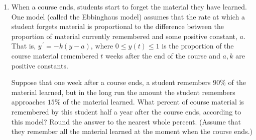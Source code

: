 \documentclass{ximera}
\begin{document}
\begin{enumerate}[label=(\arabic*)]
 












\item When a course ends, students start to forget the material they have learned.  One model (called the Ebbinghaus model) assumes that the rate at which a student forgets material is proportional to the difference between the proportion of material currently remembered and some positive constant, $a$.  That is, $y^{\,\prime}=-k(y-a)$, where $0\leq y(t)\leq 1$ is the proportion of the course material remembered $t$ weeks after the end of the course and $a,k$ are positive constants.

    Suppose that one week after a course ends, a student remembers $90$\% of the material learned, but in the long run the amount the student remembers approaches $15$\% of the material learned.  What percent of course material is remembered by this student half a year after the course ends, according to this model?  Round the answer to the nearest whole percent.  (Assume that they remember all the material learned at the moment when the course ends.)






\end{enumerate}
\end{document}
